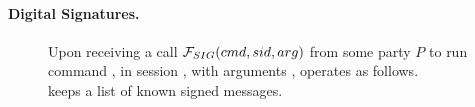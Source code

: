 \paragraph{Digital Signatures.} %

\begin{figure}
  \begin{framed}
    \begin{minipage}[t]{\textwidth}
      \textrm{Upon receiving a call $\mathcal{F}_{SIG}(cmd,sid,arg)$ from some party
        $P$ to run command \cmd, in session \sid, with arguments \arg,
        \IdealFSig operates as follows.} \\
      \textrm{\IdealFSig keeps a list \SIG of known signed messages.}      
    \end{minipage}
    \vspace*{0.5em}


\end{framed}
\end{figure}
